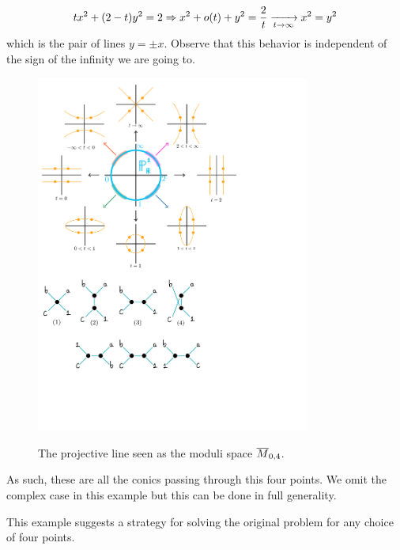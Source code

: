 \documentclass[12pt]{memoir}
\begin{document}
\begin{Ex}
    $$tx^2+(2-t)y^2=2\Rightarrow x^2+o(t)+y^2=\frac{2}{t}\xrightarrow[t\to\infty]{}x^2=y^2$$
    which is the pair of lines $y=\pm x$. Observe that this behavior is independent of the sign of the infinity we are going to. 
    \begin{figure}[h!]
        \centering
        \includegraphics[width=0.8\textwidth, trim= 0.25cm 13.1cm 5.25cm 0.5cm,clip]{figs/fig2Intro.pdf}
        \label{fig2intro}
        \caption{The projective line seen as the moduli space $\overline M_{0,4}$.}
    \end{figure}
    As such, these are all the conics passing through this four points. We omit the complex case in this example but this can be done in full generality.
\end{Ex}
   

    \newpage
This example suggests a strategy for solving the original problem for any choice of four points.
\end{document}
